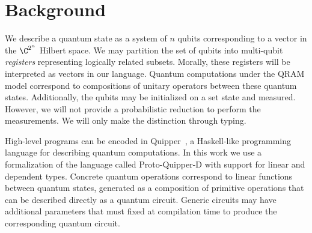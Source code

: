 \section{Background}%
\label{sec:background}

We describe a quantum state as a system of $n$ qubits corresponding to a vector in the $\C^{2^n}$ Hilbert space. We may partition the set of qubits into multi-qubit \textit{registers} representing logically related subsets. Morally, these registers will be interpreted as vectors in our language. Quantum computations under the QRAM model correspond to compositions of unitary operators between these quantum states. Additionally, the qubits may be initialized on a set state and measured. However, we will not provide a probabilistic reduction to perform the measurements. We will only make the distinction through typing.

High-level programs can be encoded in Quipper~\cite{Green2013quipper}, a Haskell-like programming language for describing quantum computations. In this work we use a formalization of the language called Proto-Quipper-D\cite{fu_tutorial_2020} with support for linear and dependent types. Concrete quantum operations correspond to linear functions between quantum states, generated as a composition of primitive operations that can be described directly as a quantum circuit. Generic circuits may have additional parameters that must fixed at compilation time to produce the corresponding quantum circuit.





